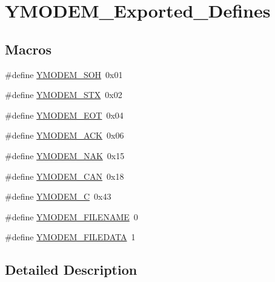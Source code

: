 \hypertarget{group___y_m_o_d_e_m___exported___defines}{}\section{Y\+M\+O\+D\+E\+M\+\_\+\+Exported\+\_\+\+Defines}
\label{group___y_m_o_d_e_m___exported___defines}
\subsection*{Macros}
\begin{DoxyCompactItemize}
\item 
\#define \mbox{\hyperlink{group___y_m_o_d_e_m___exported___defines_ga5414d3902197595ea48ec719124a020a}{Y\+M\+O\+D\+E\+M\+\_\+\+S\+OH}}~0x01
\item 
\#define \mbox{\hyperlink{group___y_m_o_d_e_m___exported___defines_ga46cda4642619d191b299108adb82f790}{Y\+M\+O\+D\+E\+M\+\_\+\+S\+TX}}~0x02
\item 
\#define \mbox{\hyperlink{group___y_m_o_d_e_m___exported___defines_ga04afd425b4fd8aaf0295d2a5da136b48}{Y\+M\+O\+D\+E\+M\+\_\+\+E\+OT}}~0x04
\item 
\#define \mbox{\hyperlink{group___y_m_o_d_e_m___exported___defines_ga21dc6d57d20876824cacb17e0557afaa}{Y\+M\+O\+D\+E\+M\+\_\+\+A\+CK}}~0x06
\item 
\#define \mbox{\hyperlink{group___y_m_o_d_e_m___exported___defines_ga914e00758ffecbdc9a0a7b7c390ee68a}{Y\+M\+O\+D\+E\+M\+\_\+\+N\+AK}}~0x15
\item 
\#define \mbox{\hyperlink{group___y_m_o_d_e_m___exported___defines_gac68fa72e4aba50a90e6f144ee191506d}{Y\+M\+O\+D\+E\+M\+\_\+\+C\+AN}}~0x18
\item 
\#define \mbox{\hyperlink{group___y_m_o_d_e_m___exported___defines_ga50e74d6ae11e478269546267299d0c38}{Y\+M\+O\+D\+E\+M\+\_\+C}}~0x43
\item 
\#define \mbox{\hyperlink{group___y_m_o_d_e_m___exported___defines_ga31ac0630de7a3813426ffddc375eea83}{Y\+M\+O\+D\+E\+M\+\_\+\+F\+I\+L\+E\+N\+A\+ME}}~0
\item 
\#define \mbox{\hyperlink{group___y_m_o_d_e_m___exported___defines_ga2d5546aa52186a0da1d4ab08bac82343}{Y\+M\+O\+D\+E\+M\+\_\+\+F\+I\+L\+E\+D\+A\+TA}}~1
\end{DoxyCompactItemize}


\subsection{Detailed Description}


